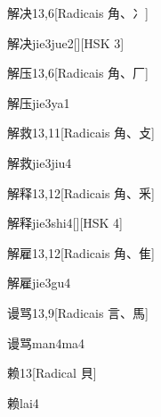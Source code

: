 \begin{entry}{解决}{13,6}[Radicais ⾓、⼎]
  \begin{phonetics}{解决}{jie3jue2}[][HSK 3]
  \end{phonetics}
\end{entry}

\begin{entry}{解压}{13,6}[Radicais ⾓、⼚]
  \begin{phonetics}{解压}{jie3ya1}
  \end{phonetics}
\end{entry}

\begin{entry}{解救}{13,11}[Radicais ⾓、⽁]
  \begin{phonetics}{解救}{jie3jiu4}
  \end{phonetics}
\end{entry}

\begin{entry}{解释}{13,12}[Radicais ⾓、⾤]
  \begin{phonetics}{解释}{jie3shi4}[][HSK 4]
  \end{phonetics}
\end{entry}

\begin{entry}{解雇}{13,12}[Radicais ⾓、⾫]
  \begin{phonetics}{解雇}{jie3gu4}
  \end{phonetics}
\end{entry}

\begin{entry}{谩骂}{13,9}[Radicais ⾔、⾺]
  \begin{phonetics}{谩骂}{man4ma4}
  \end{phonetics}
\end{entry}

\begin{entry}{赖}{13}[Radical ⾙]
  \begin{phonetics}{赖}{lai4}
  \end{phonetics}
\end{entry}


